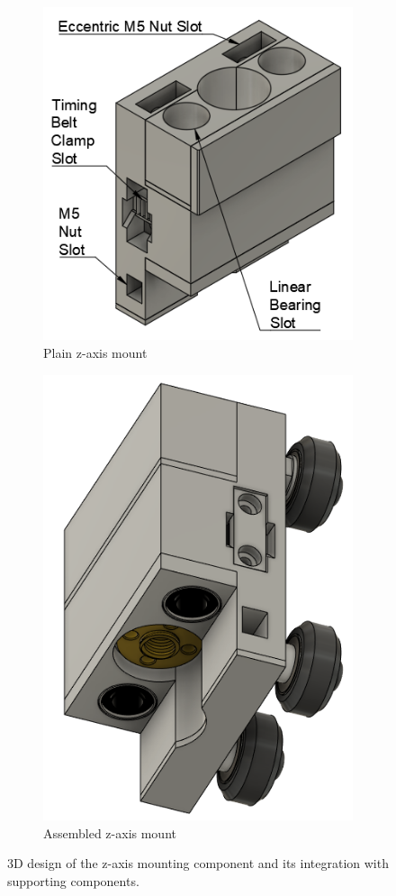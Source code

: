 \begin{figure}[!ht]
	\centering
	\begin{subfigure}{.49\textwidth}
		\centering
		\includegraphics[width=0.8\linewidth]{figures/z-axis-mount.png}
		\caption{Plain z-axis mount}
		\label{fig:z-axis-mount}
	\end{subfigure}%
	\begin{subfigure}{.35\textwidth}
		\centering
		\includegraphics[width=0.8\linewidth]{figures/z-axis-mount-assembled.png}
		\caption{Assembled z-axis mount}
		\label{fig:z-axis-mount-assembled}
	\end{subfigure}%
	\caption{3D design of the z-axis mounting component and its integration with supporting components.}
	\label{fig:z-axis-mount-container}
\end{figure}


